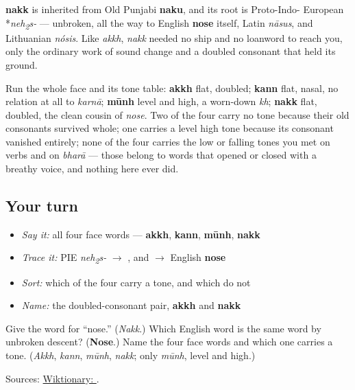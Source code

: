 \begin{cousinweb}
\textbf{nakk} is inherited from Old Punjabi \textbf{naku}, and its root is Proto-Indo- European *\emph{neh\textsubscript{2}s-} — unbroken, all the way to English \textbf{nose} itself, Latin \emph{nāsus}, and Lithuanian \emph{nósis}. Like \emph{akkh}, \emph{nakk} needed no ship and no loanword to reach you, only the ordinary work of sound change and a doubled consonant that held its ground.

Run the whole face and its tone table: \textbf{akkh} flat, doubled; \textbf{kann} flat, nasal, no relation at all to \emph{karnā}; \textbf{mūnh} level and high, a worn-down \emph{kh}; \textbf{nakk} flat, doubled, the clean cousin of \emph{nose}. Two of the four carry no tone because their old consonants survived whole; one carries a level high tone because its consonant vanished entirely; none of the four carries the low or falling tones you met on verbs and on \emph{bharā} — those belong to words that opened or closed with a breathy voice, and nothing here ever did.
\end{cousinweb}

\subsection*{Your turn}
\begin{itemize}
\raggedright
  \item \emph{Say it:} all four face words — \textbf{akkh}, \textbf{kann}, \textbf{mūnh}, \textbf{nakk}
  \item \emph{Trace it:} PIE \emph{neh\textsubscript{2}s-} $\to$ \textbf{}, and $\to$ English \textbf{nose}
  \item \emph{Sort:} which of the four carry a tone, and which do not
  \item \emph{Name:} the doubled-consonant pair, \textbf{akkh} and \textbf{nakk}
\end{itemize}

\begin{tcolorbox}[breakable,colback=teal!4,colframe=teal!35!black,title={Before you move on}]
Give the word for \textquotedblleft{}nose.\textquotedblright{} (\emph{Nakk}.) Which English word is the same word by unbroken descent? (\textbf{Nose}.) Name the four face words and which one carries a tone. (\emph{Akkh}, \emph{kann}, \emph{mūnh}, \emph{nakk}; only \emph{mūnh}, level and high.)

Sources: \href{https://en.wiktionary.org/wiki/\%E0\%A8\%A8\%E0\%A9\%B1\%E0\%A8\%95}{Wiktionary: }.
\end{tcolorbox}
